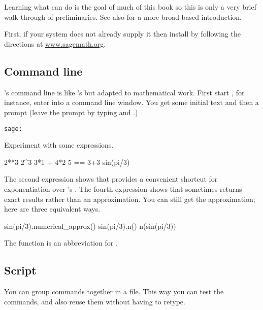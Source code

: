 \section{\Sage}
Learning what \Sage{} can do is the goal of much of this book 
so this is only a very brief walk-through of preliminaries.
See also \citep{SageTeam12} for a more broad-based introduction.

First, if your system does not already supply it then install \Sage{} 
by following the directions at
\href{http://www.sagemath.org}{www.sagemath.org}.



\subsection{Command line}
\Sage's command line is like \python's but adapted to 
mathematical work.
First start \Sage,
for instance, enter  into a command line window.
You get some initial text and then a prompt
(leave the prompt by typing 
and .)
\begin{lstlisting}[style=python]
sage:  
\end{lstlisting}

Experiment with some expressions.
\begin{sageoutput}
2**3                                                                      
2^3
3*1 + 4*2
5 == 3+3
sin(pi/3)
\end{sageoutput}
The second expression 
shows that \Sage{} provides a convenient shortcut for exponentiation over
\python's .
The fourth expression
shows that \Sage{} sometimes returns exact results rather than an
approximation.
You can still get the approximation; here are three equivalent ways.
\begin{sageoutput}
sin(pi/3).numerical_approx()
sin(pi/3).n()
n(sin(pi/3))  
\end{sageoutput}
\noindent
The function  is an abbreviation for 
.


\subsection{Script}
You can group \Sage{} commands together in a file.
This way you can test the commands, 
and also reuse them without having to retype.

